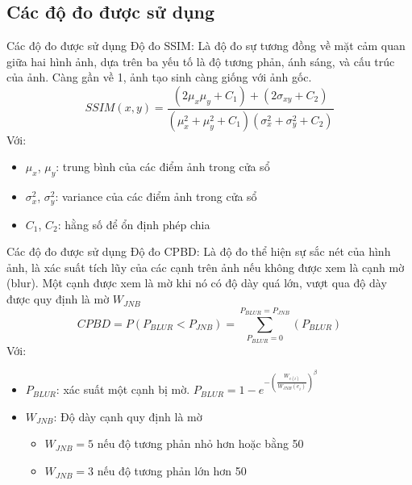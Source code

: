 \subsection{Các độ đo được sử dụng}
\begin{frame}{Các độ đo được sử dụng}
Độ đo SSIM: Là độ đo sự tương đồng về mặt cảm quan giữa hai hình ảnh, dựa trên ba yếu tố là độ tương phản, ánh sáng, và cấu trúc của ảnh. Càng gần về 1, ảnh tạo sinh càng giống với ảnh gốc.
\begin{equation}
SSIM(x,y) = \frac{(2\mu_x\mu_y + C_1) + (2 \sigma _{xy} + C_2)} 
    {(\mu_x^2 + \mu_y^2+C_1) (\sigma_x^2 + \sigma_y^2+C_2)}
\label{eq:SSMI}
\end{equation}
Với:
\begin{itemize}
    \item $\mu_x$, $\mu_y$: trung bình của các điểm ảnh trong cửa sổ
    \item $\sigma_x^2$, $\sigma_y^2$: variance của các điểm ảnh trong cửa sổ
    \item $C_1$, $C_2$: hằng số để ổn định phép chia
\end{itemize}
\end{frame}

\begin{frame}{Các độ đo được sử dụng}
Độ đo CPBD: Là độ đo thể hiện sự sắc nét của hình ảnh, là xác suất tích lũy của các cạnh trên ảnh nếu không được xem là cạnh mờ (blur). Một cạnh được xem là mờ khi nó có độ dày quá lớn, vượt qua độ dày được quy định là mờ $W_{JNB}$
\begin{equation}
CPBD = P(P_{BLUR} < P_{JNB}) = \sum^{P_{BLUR} = P_{JNB}}_{P_{BLUR} = 0}(P_{BLUR})
\label{eq:CPBD}
\end{equation}
Với:
\begin{itemize}
    \item $P_{BLUR}$: xác suất một cạnh bị mờ. $P_{BLUR} = 1 - e^{-(\frac{W_{e(i)}}{W_{JNB}(e_i)})^\beta}$
    \item $W_{JNB}$: Độ dày cạnh quy định là mờ
    \begin{itemize}
        \item $W_{JNB} = 5$ nếu độ tương phản nhỏ hơn hoặc bằng 50
        \item  $W_{JNB} = 3$ nếu độ tương phản lớn hơn 50
    \end{itemize}
\end{itemize}
\end{frame}

